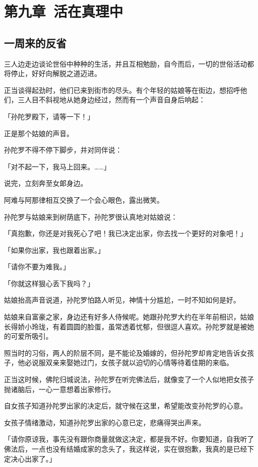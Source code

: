 \documentclass[twoside,openany]{book}
\begin{document}
\chapter{第九章\ 活在真理中}\label{ch9}

\section{一周来的反省}\label{sec9.1}

三人边走边谈论世俗中种种的生活，并且互相勉励，自今而后，一切的世俗活动都将停止，好好向解脱之道迈进。

正当谈得起劲时，他们已来到街市的尽头。有个年轻的姑娘等在街边，想招呼他们，三人目不斜视地从她身边经过，然而有一个声音自身后响起：

「孙陀罗殿下，请等一下！」

正是那个姑娘的声音。

孙陀罗不得不停下脚步，并对同伴说：

「对不起一下，我马上回来。……」

说完，立刻奔至女郞身边。

阿难与阿那律相互交换了一个会心眼色，露出微笑。

孙陀罗与姑娘来到树荫底下，孙陀罗很认真地对姑娘说：

「真抱歉，你还是对我死心了吧！我已决定出家，你去找一个更好的对象吧！」

「如果你出家，我也跟着出家。」

「请你不要为难我。」

「你就这样狠心丢下我吗？」

姑娘抬高声音说道，孙陀罗怕路人听见，神情十分尴尬，一时不知如何是好。

姑娘来自富豪之家，身边还有好多人侍候呢。她跟孙陀罗大约在半年前相识，姑娘长得娇小玲珑，有着圆圆的脸蛋，虽常透着忧郁，但很逗人喜欢。孙陀罗就是被她的可爱所吸引。

照当时的习俗，两人的阶层不同，是不能论及婚嫁的，但孙陀罗却肯定地告诉女孩子，他必说服双亲来娶她过门，女孩子就以迫切的心情等待着佳期的来临。

正当这时候，佛陀归城说法，孙陀罗在听完佛法后，就像变了一个人似地把女孩子抛诸脑后，一心一意想着出家修行。

自女孩子知道孙陀罗出家的决定后，就守候在这里，希望能改变孙陀罗的心意。

女孩子情绪激动，知道孙陀罗出家的心意已定，悲痛得哭出声来。

「请你原谅我，事先没有跟你商量就做这决定，都是我不好。你要知道，自我听了佛法后，一点也没有结婚成家的念头了，我这样说，实在很抱歉，我真的是已经下定决心出家了。」
\end{document}
